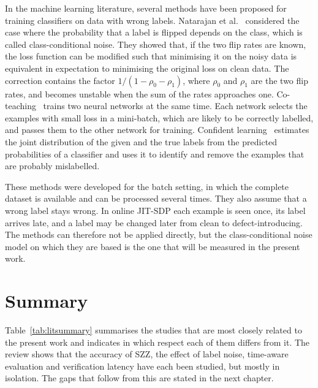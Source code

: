 \documentclass[12pt,a4paper,oneside]{report}
\newcommand{\rhoz}{\rho_0}
\newcommand{\rhoo}{\rho_1}
\begin{document}
In the machine learning literature, several methods have been proposed for
training classifiers on data with wrong labels. Natarajan et
al.~\cite{natarajan2013noisy} considered the case where the probability that
a label is flipped depends on the class, which is called class-conditional
noise. They showed that, if the two flip rates are known, the loss function
can be modified such that minimising it on the noisy data is equivalent in
expectation to minimising the original loss on clean data. The correction
contains the factor $1/(1-\rhoz-\rhoo)$, where $\rhoz$ and $\rhoo$ are the
two flip rates, and becomes unstable when the sum of the rates approaches
one. Co-teaching~\cite{han2018coteaching} trains two neural networks at the
same time. Each network selects the examples with small loss in a mini-batch,
which are likely to be correctly labelled, and passes them to the other
network for training. Confident learning~\cite{northcutt2021confident}
estimates the joint distribution of the given and the true labels from the
predicted probabilities of a classifier and uses it to identify and remove
the examples that are probably mislabelled.

These methods were developed for the batch setting, in which the complete
dataset is available and can be processed several times. They also assume
that a wrong label stays wrong. In online JIT-SDP each example is seen once,
its label arrives late, and a label may be changed later from clean to
defect-introducing. The methods can therefore not be applied directly, but
the class-conditional noise model on which they are based is the one that
will be measured in the present work.

\section{Summary}

Table~\ref{tab:litsummary} summarises the studies that are most closely
related to the present work and indicates in which respect each of them
differs from it. The review shows that the accuracy of SZZ, the effect of
label noise, time-aware evaluation and verification latency have each been
studied, but mostly in isolation. The gaps that follow from this are stated
in the next chapter.
\end{document}
